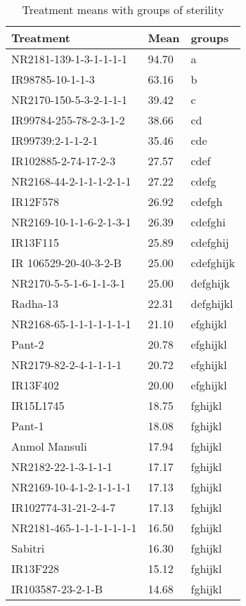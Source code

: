 \documentclass[]{article}
\begin{document}
\begin{longtable}{lll}
\caption{\label{tab:two-fac-groups-tab1}Treatment means with groups of sterility}\\
\toprule
Treatment & Mean & groups\\
\midrule
\rowcolor{gray!6}  NR2181-139-1-3-1-1-1-1 & 94.70 & a\\
IR98785-10-1-1-3 & 63.16 & b\\
\rowcolor{gray!6}  NR2170-150-5-3-2-1-1-1 & 39.42 & c\\
IR99784-255-78-2-3-1-2 & 38.66 & cd\\
\rowcolor{gray!6}  IR99739:2-1-1-2-1 & 35.46 & cde\\
\addlinespace
IR102885-2-74-17-2-3 & 27.57 & cdef\\
\rowcolor{gray!6}  NR2168-44-2-1-1-1-2-1-1 & 27.22 & cdefg\\
IR12F578 & 26.92 & cdefgh\\
\rowcolor{gray!6}  NR2169-10-1-1-6-2-1-3-1 & 26.39 & cdefghi\\
IR13F115 & 25.89 & cdefghij\\
\addlinespace
\rowcolor{gray!6}  IR 106529-20-40-3-2-B & 25.00 & cdefghijk\\
NR2170-5-5-1-6-1-1-3-1 & 25.00 & defghijk\\
\rowcolor{gray!6}  Radha-13 & 22.31 & defghijkl\\
NR2168-65-1-1-1-1-1-1-1 & 21.10 & efghijkl\\
\rowcolor{gray!6}  Pant-2 & 20.78 & efghijkl\\
\addlinespace
NR2179-82-2-4-1-1-1-1 & 20.72 & efghijkl\\
\rowcolor{gray!6}  IR13F402 & 20.00 & efghijkl\\
IR15L1745 & 18.75 & fghijkl\\
\rowcolor{gray!6}  Pant-1 & 18.08 & fghijkl\\
Anmol Mansuli & 17.94 & fghijkl\\
\addlinespace
\rowcolor{gray!6}  NR2182-22-1-3-1-1-1 & 17.17 & fghijkl\\
NR2169-10-4-1-2-1-1-1-1 & 17.13 & fghijkl\\
\rowcolor{gray!6}  IR102774-31-21-2-4-7 & 17.13 & fghijkl\\
NR2181-465-1-1-1-1-1-1-1 & 16.50 & fghijkl\\
\rowcolor{gray!6}  Sabitri & 16.30 & fghijkl\\
\addlinespace
IR13F228 & 15.12 & fghijkl\\
\rowcolor{gray!6}  IR103587-23-2-1-B & 14.68 & fghijkl\\

\end{longtable}
\end{document}
